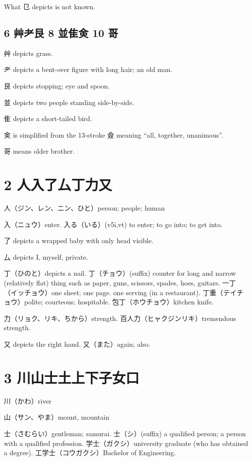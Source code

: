 What 㔾 depicts is not known.

\subsection{6 艸耂艮 8 並隹㑒 10 哥}

艸 depicts grass.

耂 depicts a bent-over figure with long hair; an old man.

艮 depicts stopping; eye and spoon.

並 depicts two people standing side-by-side.

隹 depicts a short-tailed bird.

㑒 is simplified from the 13-stroke 僉
meaning ``all, together, unanimous''.

哥 means older brother.

\section{2 人入了厶丁力又}

人（ジン、レン、ニン、ひと）person; people; human

入（ニュウ）enter.
入る（いる）(v5i,vt)
to enter; to go into; to get into.

了 depicts a wrapped baby with only head visible.

厶 depicts I, myself, private.

丁（ひのと）depicts a nail.
丁（チョウ）(suffix)
counter for long and narrow (relatively flat) thing
such as paper, guns, scissors, spades, hoes, guitars.
一丁（イッチョウ）one sheet; one page.
one serving (in a restaurant).
丁重（テイチョウ）polite; courteous; hospitable.
包丁（ホウチョウ）kitchen knife.

力（リョク、リキ、ちから）strength.
百人力（ヒャクジンリキ）tremendous strength.

又 depicts the right hand.
又（また）again; also.

\section{3 川山士土上下子女口}

川（かわ）river

山（サン、やま）mount, mountain

士（さむらい）gentleman; samurai.
士（シ）(suffix)
a qualified person;
a person with a qualified profession.
学士（ガクシ）university graduate (who has obtained a degree).
工学士（コウガクシ）Bachelor of Engineering.

